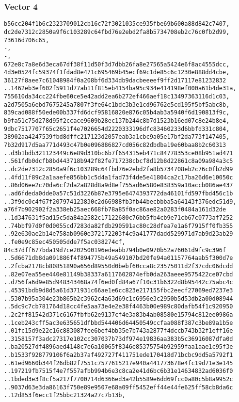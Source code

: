 \documentclass[
]{article}
\begin{document}
\hypertarget{vector-4-2}{%
\subsubsection{Vector 4}\label{vector-4-2}}

\begin{verbatim}
b56cc204f1b6c2323709012cb16c72f3021035ce935fbe69b600a88d842c7407,
dc2de7312c2850a9f6c103289c64fbd76e2ebd2fa8b5734708eb2c76c0fb2d99,
73616d706c65,
-,
-,
672e8c7a8e6d3eca67df38f11d50f3d7dbb26fa8e27565a5424e6f8ac4555dcc,
4d3e0524fc59374f1fdad8e471c695469b45ecf69c1de85c6c1230e888dd4cbe,
36127f8aee7c61048984f0a208bf6d334db9dacbeeeef9ff2d17117e81232832
..1462eb3ef602f5911d77ab11f815eb4154ba95c934e414198ef000a61b4de31a,
755610da34cc224fbe60ce5e42add2ea6b272ef466aef18c13497363116d1c03,
a2d7505a6ebd7675245a7807f3fe64c1bdc3b3e1cd96762e5cd195f5bf5abc8b,
839cad088f50ede00b337fd6dcf95816820e876c05b4ab3a5940f6d190813f9c,
b9fa51c75d278d95f2ccace9609b28ec137b244c8b7d1523b16ed07c8e24b8e4,
9dbc7517707f65c2651f4e7026654d2220333196dfc83460233d6bbfd331c804,
38902aa4247539fbd8dffc217123d2057eab3a1cbc9a05e17bf2da773f147405,
7b32d917d5aa771d493c47b0e096886827cd056c82dbdba19e60baa8b2c60313
..d3b1bdb321123449c6e89d310bc6b7f654315eb471c84778353ce08b951ad471
..561fdb0dcfb8bd443718b942f82fe717238cbcf8d12b8d22861c8a09a984a3c5
..dc2de7312c2850a9f6c103289c64fbd76e2ebd2fa8b5734708eb2c76c0fb2d99
..4fd11f89c2a1aaefe856bb1c5d4a1fad73f4de5e41804ca2c17ba26d6e10050c
..86d06ee2c70da6cf2da2a828d8a9d8ef755ad6e580e838359a10accb086ae437
..ad6fdeda0dde0a57c51d3226b87e3795e6474393772da46101fd597fbd456c1b
..3f9dc0c4f67f207974123830c2d66988fb3fb44becbbba5a64143f376edc51d9,
a76f7b902902f2a338eb25aec668fb78a85f0ac86ae82a0283f0484a161d32de
..1d347631f5ad15c5da84a2582c17122680c76bb5fb4cb9e71cb67c0773af7252
..74bbf97d0f0d0055cd7283da82fdb290591ac80c28dfea7e1a6f7915ff0fb355
..92e630ae2b14e758ab0960e372172203f4c9a41777dadd529971d7ab9d23ab29
..fe0e9c85ec450505dde7f5ac038274cf,
84c37dff677bda19d7ce202500196edeabb794b0e0970b52a76061d9fc9c396f
..5d6671db8da091886f4f894775b49a549107bd20fe94a01157764aab5f300d7e
..2fcba2178cb80851890a656d89550d0bebf60cca8c23575011d2f37cdc06dcdd
..82e07ea55ee440e81149b38337a6117602874efb0da263aeee9575422ce07cbd
..d756fa6d9e85d948343468a74f6ed0fd84a67f10c31b6322d8b95442c75abc4c
..45391bdb9d8d5a61d371931c66ae1e6cc823e217155fbc2eecf27069ed7237e3
..5307b95a304e23b865b2c3962c4a63d69c1c6956e3c2950b5d53db2a00d08944
..5dc9c7cb781764d18cc4fe5aa73e4e2e38f4463b00e989c80dafb54f1c920950
..2c2ff81542d371c6167fbfb62e9137cf4e3a83b4ab08580e15794c812ee0986a
..1ceb243cff5ac3e635651dfbbd544406d64450549ccfaa088f387c3be89a1b5e
..01fc15d9e22c16c883087fee6bef4bb35e7b743a2877f4dccb743b32f1eff16e
..3158157f3adc27317e102cc307037b73df974e19836aa383b5c36916087dfa0d
..ba20527df4896aed4148c7e6a10065f8346e85375754b92959faa1aae1c95f3e
..b1533f928779106f6a2b37af492727f411751ede170418d71bcbc9dd5a5792f1
..61ed9660b344f26db82f7551c7577615217e940a441773678e4fc19d71e3e145
..197219fb7515f4e7f557afbb994b6e3c8ca2e41d6bc6b31e14634832ad6036f0
..1bded3e3f8cf5a217f7700714d6366ed3a42b5589e6dd69fcc0a80c5b8a9952c
..9037d63e3da86163f750e89e9507e68a09ff5452eff44e44fe625ff58cb8da6c
..12d853f6ecc1f25bbc21324a27c7b13b,
\end{verbatim}
\end{document}
